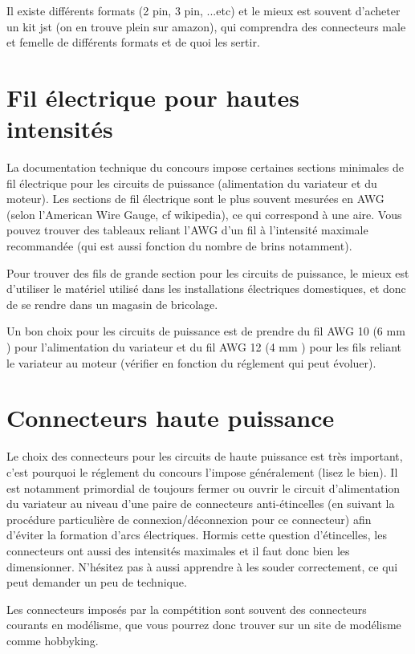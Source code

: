 \documentclass[a4paper, 11pt]{report}
\begin{document}
Il existe différents formats (2 pin, 3 pin, ...etc) et le mieux est
souvent d'acheter un kit jst (on en trouve plein sur amazon), qui
comprendra des connecteurs male et femelle de différents formats et
de quoi les sertir.

\section{Fil électrique pour hautes intensités}

La documentation technique du concours impose certaines sections minimales
de fil électrique pour les circuits de puissance (alimentation du
variateur et du moteur). Les sections de fil électrique sont le plus
souvent mesurées en AWG (selon l'American Wire Gauge, cf wikipedia),
ce qui correspond à une aire. Vous pouvez trouver des tableaux reliant
l'AWG d'un fil à l'intensité maximale recommandée (qui est aussi fonction
du nombre de brins notamment).

Pour trouver des fils de grande section pour les circuits de puissance,
le mieux est d'utiliser le matériel utilisé dans les installations
électriques domestiques, et donc de se rendre dans un magasin de bricolage.

Un bon choix pour les circuits de puissance est de prendre du fil
AWG 10 (6 mm ) pour l'alimentation du variateur et
du fil AWG 12 (4 mm ) pour les fils reliant le variateur
au moteur (vérifier en fonction du réglement qui peut évoluer).

\section{Connecteurs haute puissance}

Le choix des connecteurs pour les circuits de haute puissance est
très important, c'est pourquoi le réglement du concours l'impose généralement
(lisez le bien). Il est notamment primordial de toujours fermer ou
ouvrir le circuit d'alimentation du variateur au niveau d'une paire
de connecteurs anti-étincelles (en suivant la procédure particulière
de connexion/déconnexion pour ce connecteur) afin d'éviter la formation
d'arcs électriques. Hormis cette question d'étincelles, les connecteurs
ont aussi des intensités maximales et il faut donc bien les dimensionner.
N'hésitez pas à aussi apprendre à les souder correctement, ce qui
peut demander un peu de technique.

Les connecteurs imposés par la compétition sont souvent des connecteurs
courants en modélisme, que vous pourrez donc trouver sur un site de
modélisme comme hobbyking.
\end{document}
